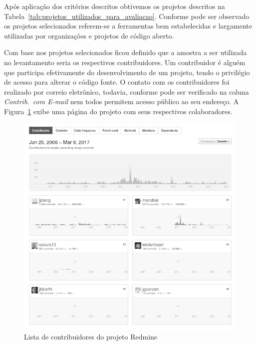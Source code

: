 Após aplicação dos critérios descritos obtivemos os projetos descritos na
Tabela~\ref{tab:projetos_utilizados_para_avaliacao}. Conforme pode ser observado
os projetos selecionados referem-se a ferramentas bem estabelecidas e largamente
utilizadas por organizações e projetos de código aberto.

\begin{table}[htpb]
\centering
{}
\caption{Projetos utilizados no levantamento com profissionais. Os dados
	apresentados tem como referência 07/03/2017.}
\label{tab:projetos_utilizados_para_avaliacao}
\end{table}

Com base nos projetos selecionados ficou definido que a amostra a ser utilizada
no levantamento seria os respectivos contribuidores. Um contribuidor é alguém
que participa efetivamente do desenvolvimento de um projeto, tendo o privilégio
de acesso para alterar o código fonte. O contato com os contribuidores foi
realizado por correio eletrônico, todavia, conforme pode ser verificado na
coluna \textit{Contrib.\ com E-mail} nem todos permitem acesso público ao seu
endereço. A Figura~\ref{fig:redmine_contribuidores} exibe uma página do projeto
com seus respectivos colaboradores.

\begin{figure}[htpb]
	\centering
	\includegraphics[width=0.8\linewidth]{./chapter-sugestoes-melhorias-fgrm/img/redmine_contribuidores.png}
	\caption{Lista de contribuidores do projeto Redmine}
\label{fig:redmine_contribuidores}
\end{figure}

